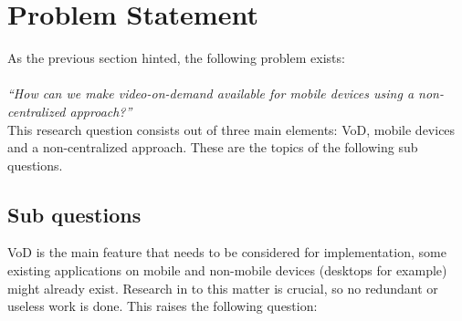 \section{Problem Statement}
As the previous section hinted, the following problem exists:\\
\\
\textit{``How can we make video-on-demand available for mobile devices using a non-centralized approach?''}\\

This research question consists out of three main elements: VoD, mobile devices and a non-centralized approach. These are the topics of  the following sub questions.

\subsection{Sub questions}
VoD is the main feature that needs to be considered for implementation, some existing applications on mobile and non-mobile devices (desktops for example) might already exist. Research in to this matter is crucial, so no redundant or useless work is done. This raises the following question:


